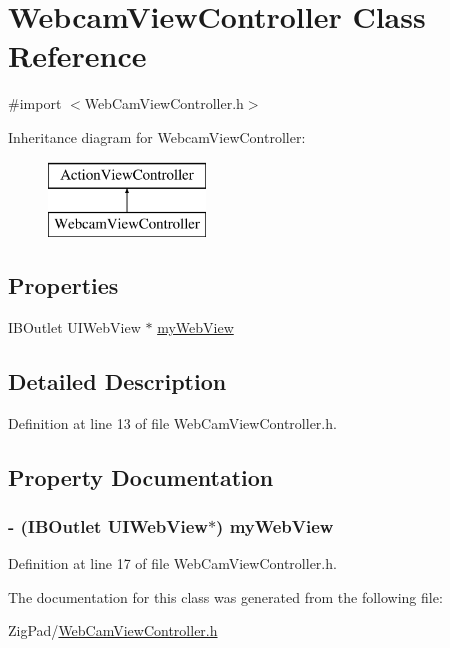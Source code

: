 \hypertarget{interface_webcam_view_controller}{
\section{WebcamViewController Class Reference}
\label{interface_webcam_view_controller}
}


{\ttfamily \#import $<$WebCamViewController.h$>$}

Inheritance diagram for WebcamViewController:\begin{figure}[H]
\begin{center}
\leavevmode
\includegraphics[height=2.000000cm]{interface_webcam_view_controller}
\end{center}
\end{figure}
\subsection*{Properties}
\begin{DoxyCompactItemize}
\item 
IBOutlet UIWebView $\ast$ \hyperlink{interface_webcam_view_controller_a9527d1e82d0094024e571c7e2e6ef741}{myWebView}
\end{DoxyCompactItemize}


\subsection{Detailed Description}


Definition at line 13 of file WebCamViewController.h.



\subsection{Property Documentation}
\hypertarget{interface_webcam_view_controller_a9527d1e82d0094024e571c7e2e6ef741}{
\subsubsection[{myWebView}]{\setlength{\rightskip}{0pt plus 5cm}-\/ (IBOutlet UIWebView$\ast$) myWebView}}
\label{interface_webcam_view_controller_a9527d1e82d0094024e571c7e2e6ef741}


Definition at line 17 of file WebCamViewController.h.



The documentation for this class was generated from the following file:\begin{DoxyCompactItemize}
\item 
ZigPad/\hyperlink{_web_cam_view_controller_8h}{WebCamViewController.h}\end{DoxyCompactItemize}
